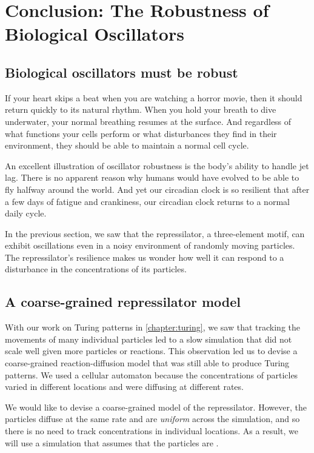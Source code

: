 \FloatBarrier
{}

\section{Conclusion: The Robustness of Biological Oscillators}
\label{sec:biological_oscillators_must_be_robust}

\subsection{Biological oscillators must be robust}

If your heart skips a beat when you are watching a horror movie, then it should return quickly to its natural rhythm. When you hold your breath to dive underwater, your normal breathing resumes at the surface. And regardless of what functions your cells perform or what disturbances they find in their environment, they should be able to maintain a normal cell cycle.

An excellent illustration of oscillator robustness is the body's ability to handle jet lag. There is no apparent reason why humans would have evolved to be able to fly halfway around the world. And yet our circadian clock is so resilient that after a few days of fatigue and crankiness, our circadian clock returns to a normal daily cycle.

In the previous section, we saw that the repressilator, a three-element motif, can exhibit oscillations even in a noisy environment of randomly moving particles. The repressilator's resilience makes us wonder how well it can respond to a disturbance in the concentrations of its particles.

\FloatBarrier
{}
\subsection{A coarse-grained repressilator model}

With our work on Turing patterns in \autoref{chapter:turing}, we saw that tracking the movements of many individual particles led to a slow simulation that did not scale well given more particles or reactions. This observation led us to devise a coarse-grained reaction-diffusion model that was still able to produce Turing patterns. We used a cellular automaton because the concentrations of particles varied in different locations and were diffusing at different rates.

We would like to devise a coarse-grained model of the repressilator. However, the particles diffuse at the same rate and are \textit{uniform} across the simulation, and so there is no need to track concentrations in individual locations. As a result, we will use a simulation that assumes that the particles are .

